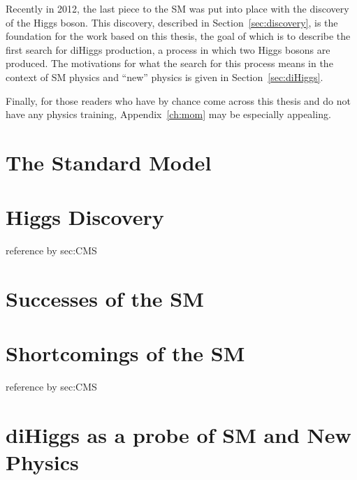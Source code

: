 Recently in 2012, the last piece to the SM was put into place with the discovery of the Higgs boson.
This discovery, described in Section~\ref{sec:discovery}, is the foundation for the work based on
this thesis, the goal of which is to describe the first search for diHiggs production, a process
in which two Higgs bosons are produced. The motivations for what the search for this process means
in the context of SM physics and ``new'' physics is given in Section~\ref{sec:diHiggs}.

Finally, for those readers who have by chance come across this thesis and do not
have any physics training, Appendix~\ref{ch:mom} may be especially appealing.

\section{The Standard Model\label{sec:SM}}

\section{Higgs Discovery\label{sec:discovery}}
reference by sec:CMS

\section{Successes of the SM\label{sec:SMsuccess}}

\section{Shortcomings of the SM\label{sec:SMshortcomings}}
reference by sec:CMS


\section{diHiggs as a probe of SM and New Physics\label{sec:diHiggs}}

